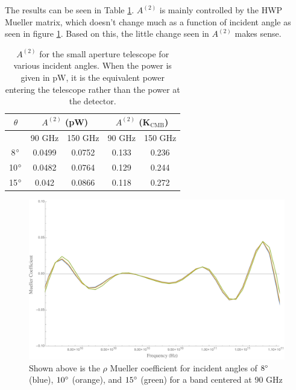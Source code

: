\documentclass{article}
\theoremstyle{remark}
\newcommand{\A}[1]{A^{(#1)}}
\begin{document}
The results can be seen in Table \ref{table:smallAp_A2}.
$\A2$ is mainly controlled by the HWP Mueller matrix, which doesn't change much as a function of incident angle as seen in figure \ref{fig:Mueller_incAngles}.
Based on this, the little change seen in $\A2$ makes sense.

 \begin{table}[h]
\centering

\begin{tabular}{|c|c|c|c|c|}
\hline
$\theta$ & \multicolumn{2}{|c|}{$\A2 $ (pW)}&  \multicolumn{2}{|c|}{$\A2 $ (K$_\text{CMB}$)} \\
\hline
      & 90 GHz   & 150 GHz  & 90 GHz & 150 GHz         \\
\hline
8$\degree$   & 0.0499 & 0.0752 & 0.133  & 0.236\\
10$\degree$  & 0.0482 & 0.0764 & 0.129  & 0.244\\
15$\degree$  & 0.042  & 0.0866 & 0.118  & 0.272\\\hline
\end{tabular}
\caption{ $\A2$ for the small aperture telescope for various incident angles. 
When the power is given in pW, it is the equivalent power entering the telescope rather than the power at the detector.
}
\label{table:smallAp_A2}
\end{table}


\begin{figure}[t!]
	\centering
  \includegraphics[width=.6\linewidth]{MuellerIncAngles.pdf}
  \caption{Shown above is the $\rho$ Mueller coefficient for incident angles of $8\degree$ (blue), $10\degree$ (orange), and $15\degree$ (green) for a band centered at 90 GHz}
  \label{fig:Mueller_incAngles}
\end{figure}

\section*{}
\end{document}
